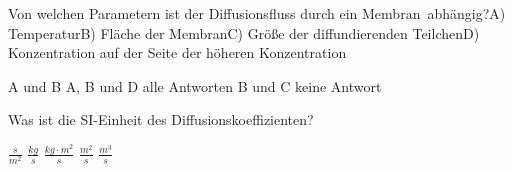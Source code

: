 \documentclass[11pt]{exam}
\begin{document}
\begin{questions}
\vspace{3mm}\question Von welchen Parametern ist der Diffusionsfluss durch ein Membran abhängig?A) TemperaturB) Fläche der MembranC) Größe der diffundierenden TeilchenD) Konzentration auf der Seite der höheren Konzentration

\begin{choices}
	\choice A und B
	\choice A, B und D
	\choice alle Antworten
	\choice B und C
	\choice keine Antwort
\end{choices}

\vspace{3mm}\question Was ist die SI-Einheit des Diffusionskoeffizienten?

\begin{choices}
	\choice \( \frac{s}{m^2} \)
	\choice \( \frac{kg}{s} \)
	\choice \( \frac{kg \cdot m^2}{s} \)
	\choice \( \frac{m^2}{s} \)
	\choice \( \frac{m^3}{s} \)
\end{choices}

\vspace{3mm}\end{questions}
\end{document}
